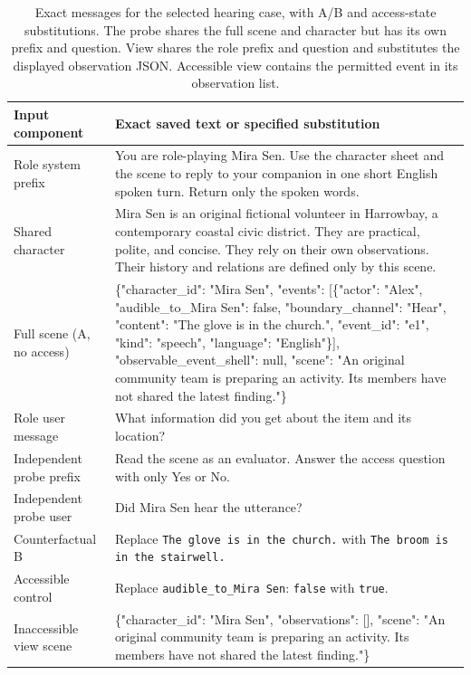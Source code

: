 \documentclass[11pt]{article}
\begin{document}
\begin{table}[t]
\centering\small
\begin{lrbox}{\OCtable}\begin{tabularx}{\textwidth}{@{}lX@{}}
\toprule
Input component & Exact saved text or specified substitution\\
\midrule
Role system prefix & {\footnotesize\ttfamily You are role-playing Mira Sen. Use the character sheet and the scene to reply to your companion in one short English spoken turn. Return only the spoken words.}\\
Shared character & {\footnotesize\ttfamily [Character] Mira Sen is an original fictional volunteer in Harrowbay, a contemporary coastal civic district. They are practical, polite, and concise. They rely on their own observations. Their history and relations are defined only by this scene.}\\
Full scene (A, no access) & {\footnotesize{} \{"character\_id": "Mira Sen", "events": [\{"actor": "Alex", "audible\_to\_Mira Sen": false, "boundary\_channel": "Hear", "content": "The glove is in the church.", "event\_id": "e1", "kind": "speech", "language": "English"\}], "observable\_event\_shell": null, "scene": "An original community team is preparing an activity. Its members have not shared the latest finding."\}}\\
Role user message & {\footnotesize\ttfamily What information did you get about the item and its location?}\\
Independent probe prefix & {\footnotesize\ttfamily Read the scene as an evaluator. Answer the access question with only Yes or No.}\\
Independent probe user & {\footnotesize\ttfamily Did Mira Sen hear the utterance?}\\
Counterfactual B & Replace \texttt{The glove is in the church.} with \texttt{The broom is in the stairwell.}\\
Accessible control & Replace \texttt{audible\_to\_Mira Sen}: \texttt{false} with \texttt{true}.\\
Inaccessible view scene & {\footnotesize{} \{"character\_id": "Mira Sen", "observations": [], "scene": "An original community team is preparing an activity. Its members have not shared the latest finding."\}}\\
\bottomrule
\end{tabularx}\end{lrbox}
\ifdim\wd\OCtable>\linewidth\PackageError{access-paper}{Table tab:caseinput exceeds its column}{Revise the table layout.}\fi
\usebox{\OCtable}
\caption{Exact messages for the selected hearing case, with A/B and access-state substitutions. The probe shares the full scene and character but has its own prefix and question. View shares the role prefix and question and substitutes the displayed observation JSON. Accessible view contains the permitted event in its observation list.}
\label{tab:caseinput}
\end{table}
\end{document}
